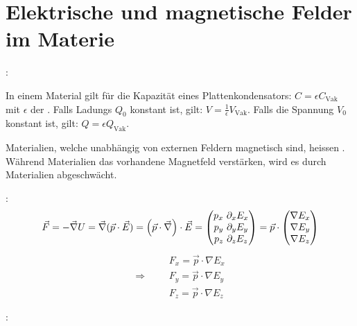 \section{Elektrische und magnetische Felder im Materie}

\vspace{1\baselineskip}

:

In einem Material gilt für die Kapazität eines Plattenkondensators: $C = \epsilon C_{\text{Vak}}$
mit $\epsilon$ der . Falls Ladungs $Q_0$ konstant ist, gilt:
$V = \frac{1}{\epsilon} V_{\text{Vak}}$. Falls die Spannung $V_0$ konstant ist, gilt:
$Q = \epsilon Q_{\text{Vak}}$.

\vspace{1\baselineskip}

Materialien, welche unabhängig von externen Feldern magnetisch sind, heissen .
Während  Materialien das vorhandene Magnetfeld verstärken, wird es durch
 Materialien abgeschwächt.

\vspace{1\baselineskip}

:
\begin{align*}
    \vec{F} = - \vec{\nabla} U = \vec{\nabla} (\vec{p} \cdot \vec{E})
    = \left( \vec{p} \cdot \vec{\nabla} \right) \cdot \vec{E}
    = \begin{pmatrix}
        p_x \ \partial_x E_x \\ p_y \ \partial_y E_y \\ p_z \ \partial_z E_z
    \end{pmatrix}
    = \vec{p} \cdot \begin{pmatrix}
        \nabla E_x \\ \nabla E_y \\ \nabla E_z
    \end{pmatrix}
\end{align*}
\begin{align*}
    &F_x = \vec{p} \cdot \nabla E_x \\
    \Longrightarrow \hspace{20pt} &F_y = \vec{p} \cdot \nabla E_y \\
    &F_z = \vec{p} \cdot \nabla E_z
\end{align*}

\vspace{1\baselineskip}

:

